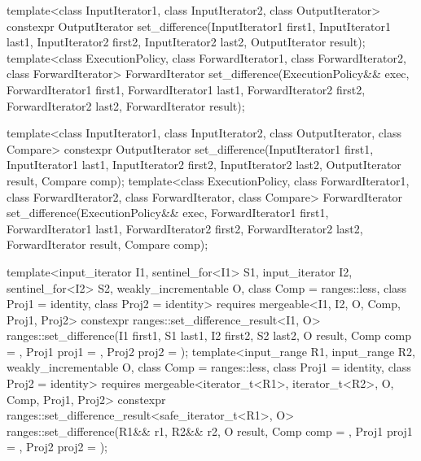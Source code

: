%
\begin{itemdecl}
template<class InputIterator1, class InputIterator2,
         class OutputIterator>
  constexpr OutputIterator
    set_difference(InputIterator1 first1, InputIterator1 last1,
                   InputIterator2 first2, InputIterator2 last2,
                   OutputIterator result);
template<class ExecutionPolicy, class ForwardIterator1, class ForwardIterator2,
         class ForwardIterator>
  ForwardIterator
    set_difference(ExecutionPolicy&& exec,
                   ForwardIterator1 first1, ForwardIterator1 last1,
                   ForwardIterator2 first2, ForwardIterator2 last2,
                   ForwardIterator result);

template<class InputIterator1, class InputIterator2,
         class OutputIterator, class Compare>
  constexpr OutputIterator
    set_difference(InputIterator1 first1, InputIterator1 last1,
                   InputIterator2 first2, InputIterator2 last2,
                   OutputIterator result, Compare comp);
template<class ExecutionPolicy, class ForwardIterator1, class ForwardIterator2,
         class ForwardIterator, class Compare>
  ForwardIterator
    set_difference(ExecutionPolicy&& exec,
                   ForwardIterator1 first1, ForwardIterator1 last1,
                   ForwardIterator2 first2, ForwardIterator2 last2,
                   ForwardIterator result, Compare comp);

template<input_iterator I1, sentinel_for<I1> S1, input_iterator I2, sentinel_for<I2> S2,
         weakly_incrementable O, class Comp = ranges::less,
         class Proj1 = identity, class Proj2 = identity>
  requires mergeable<I1, I2, O, Comp, Proj1, Proj2>
  constexpr ranges::set_difference_result<I1, O>
    ranges::set_difference(I1 first1, S1 last1, I2 first2, S2 last2, O result,
                           Comp comp = {}, Proj1 proj1 = {}, Proj2 proj2 = {});
template<input_range R1, input_range R2, weakly_incrementable O,
         class Comp = ranges::less, class Proj1 = identity, class Proj2 = identity>
  requires mergeable<iterator_t<R1>, iterator_t<R2>, O, Comp, Proj1, Proj2>
  constexpr ranges::set_difference_result<safe_iterator_t<R1>, O>
    ranges::set_difference(R1&& r1, R2&& r2, O result,
                           Comp comp = {}, Proj1 proj1 = {}, Proj2 proj2 = {});
\end{itemdecl}

